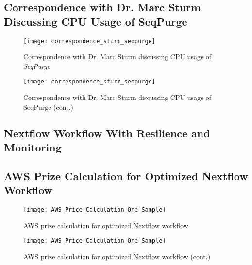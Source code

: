 \subsection{Correspondence with Dr. Marc Sturm Discussing CPU Usage of SeqPurge}\label{appendix:correspondecemarc}
\begin{figure}[H]
    \centering
	\texttt{[image: correspondence\_sturm\_seqpurge]}
	\caption[Correspondence with Dr. Marc Sturm discussing CPU usage of SeqPurge]{Correspondence with Dr. Marc Sturm discussing CPU usage of \textit{SeqPurge}}
	\label{fig:correspondecemarc}
\end{figure}
\begin{figure}[H]\ContinuedFloat
    \centering
	\texttt{[image: correspondence\_sturm\_seqpurge]}
	\caption{Correspondence with Dr. Marc Sturm discussing CPU usage of SeqPurge (cont.)}
\end{figure}

\clearpage
\subsection{Nextflow Workflow With Resilience and Monitoring}\label{appendix:megsapgermlinev1}


\clearpage
\subsection{\ac{AWS} Prize Calculation for Optimized Nextflow Workflow}\label{appendix:awspricecalculationoptimized}
\begin{figure}[H]
    \centering
	\texttt{[image: AWS\_Price\_Calculation\_One\_Sample]}
	\caption{\ac{AWS} prize calculation for optimized Nextflow workflow}
\end{figure}
\begin{figure}[H]\ContinuedFloat
    \centering
	\texttt{[image: AWS\_Price\_Calculation\_One\_Sample]}
	\caption{\ac{AWS} prize calculation for optimized Nextflow workflow (cont.)}
\end{figure}

\clearpage
